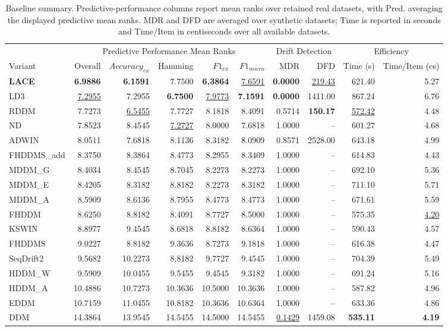 \begin{table}
\caption{Baseline summary. Predictive-performance columns report mean ranks over retained real datasets, with Pred. averaging the displayed predictive mean ranks. MDR and DFD are averaged over synthetic datasets; Time is reported in seconds and Time/Item in centiseconds over all available datasets.}
\label{tab:baseline_summary}
\begin{tabular}{lrrrrrrrrr}
\toprule
 & \multicolumn{5}{c}{Predictive Performance Mean Ranks} & \multicolumn{2}{c}{Drift Detection} & \multicolumn{2}{c}{Efficiency} \\
\cmidrule(lr){2-6} \cmidrule(lr){7-8} \cmidrule(lr){9-10}
Variant & Overall & $Accuracy_{ex}$ & Hamming & $F1_{ex}$ & $F1_{micro}$ & MDR & DFD & Time (s) & Time/Item (cs) \\
\midrule
\textbf{LACE} & \textbf{6.9886} & \textbf{6.1591} & 7.7500 & \textbf{6.3864} & \underline{7.6591} & \textbf{0.0000} & \underline{219.43} & 621.40 & 5.27 \\
LD3 & \underline{7.2955} & 7.2955 & \textbf{6.7500} & \underline{7.9773} & \textbf{7.1591} & \textbf{0.0000} & 1411.00 & 867.24 & 6.76 \\
RDDM & 7.7273 & \underline{6.5455} & 7.7727 & 8.1818 & 8.4091 & 0.5714 & \textbf{150.17} & \underline{572.42} & 4.48 \\
ND & 7.8523 & 8.4545 & \underline{7.2727} & 8.0000 & 7.6818 & 1.0000 & -- & 601.27 & 4.68 \\
ADWIN & 8.0511 & 7.6818 & 8.1136 & 8.3182 & 8.0909 & 0.8571 & 2528.00 & 643.18 & 4.99 \\
FHDDMS\_add & 8.3750 & 8.3864 & 8.4773 & 8.2955 & 8.3409 & 1.0000 & -- & 614.83 & 4.43 \\
MDDM\_G & 8.4034 & 8.4545 & 8.7045 & 8.2273 & 8.2273 & 1.0000 & -- & 692.10 & 5.36 \\
MDDM\_E & 8.4205 & 8.3182 & 8.8182 & 8.2273 & 8.3182 & 1.0000 & -- & 711.10 & 5.71 \\
MDDM\_A & 8.5909 & 8.6136 & 8.7955 & 8.4773 & 8.4773 & 1.0000 & -- & 671.61 & 5.59 \\
FHDDM & 8.6250 & 8.8182 & 8.4091 & 8.7727 & 8.5000 & 1.0000 & -- & 575.35 & \underline{4.20} \\
KSWIN & 8.8977 & 9.4545 & 8.6818 & 8.8182 & 8.6364 & 1.0000 & -- & 590.43 & 4.57 \\
FHDDMS & 9.0227 & 8.8182 & 9.3636 & 8.7273 & 9.1818 & 1.0000 & -- & 616.38 & 4.47 \\
SeqDrift2 & 9.5682 & 10.2273 & 8.8182 & 9.7727 & 9.4545 & 1.0000 & -- & 704.39 & 5.49 \\
HDDM\_W & 9.5909 & 10.0455 & 9.5455 & 9.4545 & 9.3182 & 1.0000 & -- & 691.24 & 5.16 \\
HDDM\_A & 10.4886 & 10.7273 & 10.3636 & 10.5000 & 10.3636 & 1.0000 & -- & 587.82 & 4.96 \\
EDDM & 10.7159 & 11.0455 & 10.8182 & 10.3636 & 10.6364 & 1.0000 & -- & 633.36 & 4.86 \\
DDM & 14.3864 & 13.9545 & 14.5455 & 14.5000 & 14.5455 & \underline{0.1429} & 1459.08 & \textbf{535.11} & \textbf{4.19} \\
\bottomrule
\end{tabular}
\end{table}
